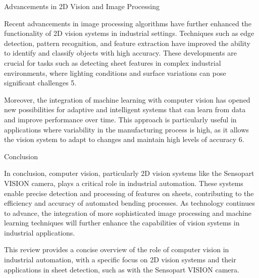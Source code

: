 Advancements in 2D Vision and Image Processing

Recent advancements in image processing algorithms have further enhanced the functionality of 2D vision systems in industrial settings. Techniques such as edge detection, pattern recognition, and feature extraction have improved the ability to identify and classify objects with high accuracy. These developments are crucial for tasks such as detecting sheet features in complex industrial environments, where lighting conditions and surface variations can pose significant challenges 5.

Moreover, the integration of machine learning with computer vision has opened new possibilities for adaptive and intelligent systems that can learn from data and improve performance over time. This approach is particularly useful in applications where variability in the manufacturing process is high, as it allows the vision system to adapt to changes and maintain high levels of accuracy 6.

Conclusion

In conclusion, computer vision, particularly 2D vision systems like the Sensopart VISION camera, plays a critical role in industrial automation. These systems enable precise detection and processing of features on sheets, contributing to the efficiency and accuracy of automated bending processes. As technology continues to advance, the integration of more sophisticated image processing and machine learning techniques will further enhance the capabilities of vision systems in industrial applications.

This review provides a concise overview of the role of computer vision in industrial automation, with a specific focus on 2D vision systems and their applications in sheet detection, such as with the Sensopart VISION camera.